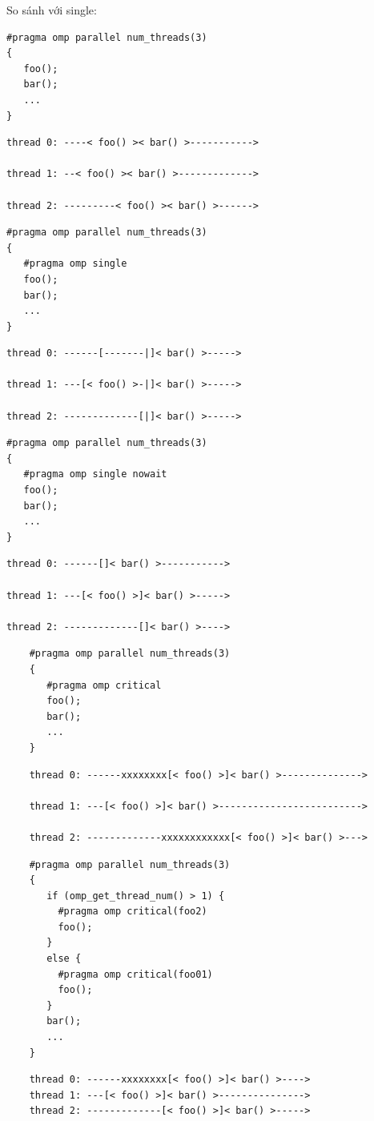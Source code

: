 \documentclass[14pt, a4paper]{article}
\numberwithin{equation}{section}
\numberwithin{figure}{section}
\numberwithin{dl}{section}
\numberwithin{md}{section}
\numberwithin{bd}{section}
\numberwithin{dn}{section}
\numberwithin{hq}{section}
\begin{document}
So sánh với single:

\begin{verbatim}
#pragma omp parallel num_threads(3)
{
   foo();
   bar();
   ...
}
\end{verbatim}
\begin{verbatim}
thread 0: ----< foo() >< bar() >----------->

thread 1: --< foo() >< bar() >------------->

thread 2: ---------< foo() >< bar() >------>
\end{verbatim}
\begin{verbatim}
#pragma omp parallel num_threads(3)
{
   #pragma omp single
   foo();
   bar();
   ...
}
    \end{verbatim}
    \begin{verbatim}
thread 0: ------[-------|]< bar() >----->

thread 1: ---[< foo() >-|]< bar() >----->

thread 2: -------------[|]< bar() >----->
    \end{verbatim}
        
\begin{verbatim}
#pragma omp parallel num_threads(3)
{
   #pragma omp single nowait
   foo();
   bar();
   ...
}
    \end{verbatim}
    \begin{verbatim}
thread 0: ------[]< bar() >----------->

thread 1: ---[< foo() >]< bar() >----->

thread 2: -------------[]< bar() >---->
    \end{verbatim}

\begin{verbatim}
    #pragma omp parallel num_threads(3)
    {
       #pragma omp critical
       foo();
       bar();
       ...
    }
        \end{verbatim}
        \begin{verbatim}
    thread 0: ------xxxxxxxx[< foo() >]< bar() >-------------->
    
    thread 1: ---[< foo() >]< bar() >------------------------->
    
    thread 2: -------------xxxxxxxxxxxx[< foo() >]< bar() >--->
        \end{verbatim}

\begin{verbatim}
    #pragma omp parallel num_threads(3)
    {
       if (omp_get_thread_num() > 1) {
         #pragma omp critical(foo2)
         foo();
       }
       else {
         #pragma omp critical(foo01)
         foo();
       }
       bar();
       ...
    }
        \end{verbatim}
        \begin{verbatim}
    thread 0: ------xxxxxxxx[< foo() >]< bar() >---->
    thread 1: ---[< foo() >]< bar() >--------------->
    thread 2: -------------[< foo() >]< bar() >----->
\end{verbatim}
\end{document}
